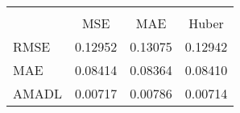 \begin{tabular}{lccc}
\hline\hline \\ [-1.8ex]
 & MSE & MAE & Huber \\ 
 \hline 
RMSE & 0.12952 & 0.13075 & 0.12942 \\ 
MAE & 0.08414 & 0.08364 & 0.08410 \\ 
AMADL & 0.00717 & 0.00786 & 0.00714 \\ 
\hline\hline
\end{tabular}